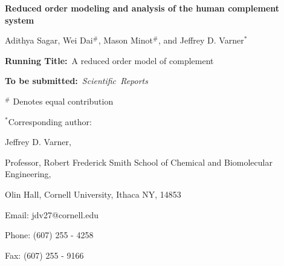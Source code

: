 \documentclass[12pt]{article}
\begin{document}
\begin{titlepage}
{\par\centering\textbf{\Large {Reduced order modeling and analysis of the human complement system}}}
\vspace{0.05in}
{\par \centering \large{Adithya Sagar, Wei Dai$^{\#}$, Mason Minot$^{\#}$, and Jeffrey D. Varner$^{*}$}}
\vspace{0.10in}
{\par {}}
{\par {}}
\vspace{0.1in}
{\par \centering \textbf{Running Title:}~A reduced order model of complement}
\vspace{0.1in}
{\par \centering \textbf{To be submitted:}~\emph{Scientific~Reports}}
\vspace{0.5in}
{\par \centering $^{\#}$ Denotes equal contribution}
\vspace{0.1in}
{\par \centering $^{*}$Corresponding author:}
{\par \centering Jeffrey D. Varner,}
{\par \centering Professor, Robert Frederick Smith School of Chemical and Biomolecular Engineering,}
{\par {} Olin Hall, Cornell University, Ithaca NY, 14853}
{\par \centering Email: jdv27@cornell.edu}
{\par \centering Phone: (607) 255 - 4258}
{\par \centering Fax: (607) 255 - 9166}
\end{titlepage}
\date{}
\thispagestyle{empty}
\pagebreak
\end{document}
